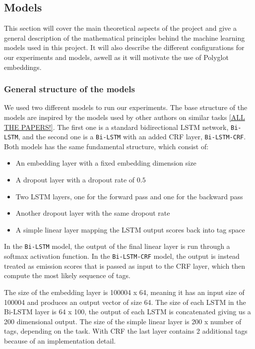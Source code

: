 
\subsection{Models}

This section will cover the main theoretical aspects of the project and give a
general description of the mathematical principles behind the machine learning
models used in this project. It will also describe the different configurations
for our experiments and models, aswell as it will motivate the use of Polyglot
embeddings.


\subsubsection{General structure of the models}

We used two different models to run our experiments. The base structure of the
models are inspired by the models used by other authors on similar tasks
\ref{ALL THE PAPERS!}. The first one is a standard bidirectional LSTM network,
\texttt{Bi-LSTM}, and the second one is a \texttt{Bi-LSTM} with an added CRF
layer, \texttt{Bi-LSTM-CRF}. Both models has the same fundamental structure,
which consist of:

\begin{itemize}
    \item An embedding layer with a fixed embedding dimension size
    \item A dropout layer with a dropout rate of $0.5$
    \item Two LSTM layers, one for the forward pass and one for the backward
        pass
    \item Another dropout layer with the same dropout rate
    \item A simple linear layer mapping the LSTM output scores back into tag
        space
\end{itemize}

In the \texttt{Bi-LSTM} model, the output of the final linear layer is run
through a softmax activation function. In the \texttt{Bi-LSTM-CRF} model, the
output is instead treated as emission scores that is passed as input to the CRF
layer, which then compute the most likely sequence of tags.

The size of the embedding layer is 100004 x 64, meaning it has an input size of
100004 and produces an output vector of size 64. The size of each LSTM in the
Bi-LSTM layer is 64 x 100, the output of each LSTM is concatenated giving us a
200 dimensional output. The size of the simple linear layer is 200 x number of
tags, depending on the task. With CRF the last layer contains 2 additional tags
because of an implementation detail. 

